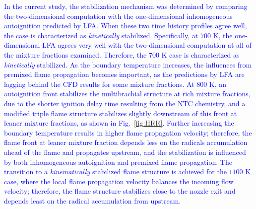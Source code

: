 \documentclass[review,3p,times]{elsarticle}
\begin{document}
\textcolor{blue}{In the current study, the stabilization mechanism was determined by comparing the two-dimensional computation with the one-dimensional inhomogeneous autoignition predicted by LFA.  When these two time history profiles agree well, the case is characterized as \emph{kinetically} stabilized.  Specifically, at $700$ K, the one-dimensional LFA agrees very well with the two-dimensional computation at all of the mixture fractions examined.  Therefore, the $700$ K case is characterized as \emph{kinetically} stabilized.  As the boundary temperature increases, the influences from premixed flame propagation becomes important, as the predictions by LFA are lagging behind the CFD results for some mixture fractions.  At $800$ K, an autoignition front stabilizes the multibrachial structure at rich mixture fractions, due to the shorter ignition delay time resulting from the NTC chemistry, and a modified triple flame structure stabilizes slightly downstream of this front at leaner mixture fractions, as shown in Fig.~\ref{fig:HRR}.  Further increasing the boundary temperature results in higher flame propagation velocity; therefore, the flame front at leaner mixture fraction depends less on the radicals accumulation ahead of the flame and propagates upstream, and the stabilization is influenced by both inhomogeneous autoignition and premixed flame propagation.  The transition to a \emph {kinematically} stabilized flame structure is achieved for the $1100$ K case, where the local flame propagation velocity balances the incoming flow velocity; therefore, the flame structure stabilizes close to the nozzle exit and depends least on the radical accumulation from upstream.}

\end{document}
